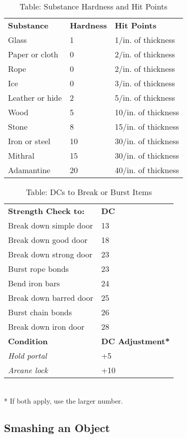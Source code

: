 \begin{table}[]
\sffamily
\caption{Table: Substance Hardness and Hit Points}
\begin{tabular}{lll}
\textbf{Substance} & \textbf{Hardness} & \textbf{Hit Points}\\
Glass & 1 & 1/in. of thickness\\
Paper or cloth & 0 & 2/in. of thickness\\
Rope & 0 & 2/in. of thickness\\
Ice & 0 & 3/in. of thickness\\
Leather or hide & 2 & 5/in. of thickness\\
Wood & 5 & 10/in. of thickness\\
Stone & 8 & 15/in. of thickness\\
Iron or steel & 10 & 30/in. of thickness\\
Mithral & 15 & 30/in. of thickness\\
Adamantine & 20 & 40/in. of thickness\\
\end{tabular}
\end{table}

\begin{table}[]
\sffamily
\caption{Table: DCs to Break or Burst Items}
\begin{tabular}{ll}
\textbf{Strength Check to:} & \textbf{DC}\\
Break down simple door & 13\\
Break down good door & 18\\
Break down strong door & 23\\
Burst rope bonds & 23\\
Bend iron bars & 24\\
Break down barred door & 25\\
Burst chain bonds & 26\\
Break down iron door & 28\\
\textbf{Condition} & \textbf{DC Adjustment*}\\
\textit{Hold portal} & +5\\
\textit{Arcane lock} & +10\\
\end{tabular}\\
* If both apply, use the larger number.
\end{table}
		
\subsection{Smashing an Object}

